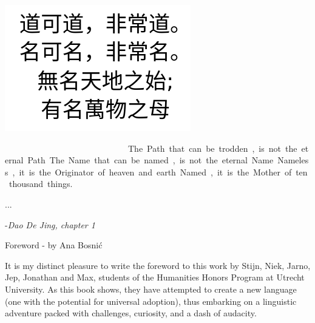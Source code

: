 \begin{center}{\it

	\includegraphics[scale=0.5]{./Images/Chinese.jpeg}
	\vspace{0.8cm} 

	\renewcommand{\corpsgrootte}{15pt}
\lol\pe\Atlanpi\tom\comma \Atlanne\si \lol\tet

\na\pe\Atlanpi\na\comma \Atlanne\si \na\tet 

\si\Atlanne\Atlanpi\na\comma \si \mi \ta\som\an\tem 

\si\Atlanpi\na\comma \si \Atlanfi\pet \ta\on\mus 
\restorecorps

	\vspace{0.8cm} 

The Path that can be trodden, 

is not the eternal Path. 

The Name that can be named, 

is not the eternal Name. 

Nameless, it is the Originator  

of heaven and earth 

Named, it is the Mother  

of ten thousand things. 
}

...


-{\it Dao De Jing, chapter 1}

\end{center}


\pagebreak

{\Large Foreword - by Ana Bosni\'{c}}

\noindent It is my distinct pleasure to write the foreword to this work by Stijn, Niek, Jarno, Jep, Jonathan and Max, students of the Humanities Honors Program at Utrecht University. As this book shows, they have attempted to create a new language (one with the potential for universal adoption), thus embarking on a linguistic adventure packed with challenges, curiosity, and a dash of audacity.  

